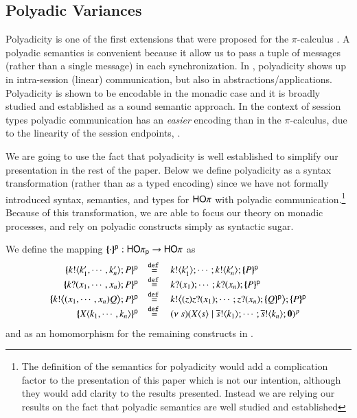 \subsection{Polyadic Variances}

Polyadicity is one of the first extensions that were proposed
for the $\pi$-calculus \dk{\cite{}}. A polyadic semantics is convenient because it allow us to pass 
a tuple of messages (rather than a single message) in each synchronization.
In \HOp, polyadicity shows up in intra-session (linear) communication, but also in abstractions/applications. 
Polyadicity is shown to be encodable in the monadic case and it is broadly studied
and established as a sound semantic approach.
In the context of session types polyadic communication
has an {\em easier} encoding than in the $\pi$-calculus,
due to the linearity of the session endpoints, \cite{VascoFun}.

We are going to use the fact that polyadicity is well established
to simplify our presentation in the rest of the paper.
Below we define polyadicity as a syntax transformation (rather than as a typed encoding) since we have not
formally introduced syntax, semantics, and types for $\mathsf{HO}\pi$ with polyadic communication.\footnote{
The definition of the semantics for polyadicity would add a complication
factor to the presentation of this paper which is not our intention,
although they would add clarity to the results presented.
Instead we are relying our results on the fact that polyadic semantics are well
studied and established}
Because of this transformation, we are able to focus our theory on monadic processes, and rely on polyadic constructs simply as syntactic sugar.

\begin{definition}
We define the mapping $\{\!\!\{\cdot\}\!\!\}^\mathsf{p}:\mathsf{HO}\pi_{\mathsf{p}} \to \mathsf{HO}\pi$ as
\[
	\begin{array}{rcl}
			\auxmap{\bout{k}{k'_1, \cdots, k'_n} P}{\mathsf{p}} &\defeq& \bout{k}{k'_1} \cdots ;  \bout{k}{k'_n} \auxmap{P}{\mathsf{p}}\\
			\auxmap{\binp{k}{x_1, \cdots, x_n} P}{\mathsf{p}} &\defeq& \binp{k}{x_1} \cdots ; \binp{k}{x_n}  \auxmap{P}{\mathsf{p}} \\
			\auxmap{\bbout{k}{\abs{x_1, \cdots, x_n} Q} P}{\mathsf{p}} &\defeq& \bbout{k}{\abs{z}\binp{z}{x_1} \cdots ; \binp{z}{x_n}\auxmap{Q}{\mathsf{p}}} \auxmap{P}{\mathsf{p}}\\
			\auxmap{\appl{X}{k_1, \cdots, k_n}}{\mathsf{p}}  &\defeq& \newsp{s}{\appl{X}{s} \Par \bout{\dual{s}}{k_1} \cdots ; \bout{\dual{s}}{k_n} \inact}^{p}
	\end{array}
	\]
	and as an homomorphism for the remaining constructs in \pHOp. 
\end{definition}

